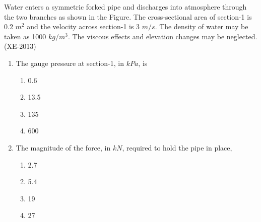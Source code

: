 \documentclass[journal]{IEEEtran}
\numberwithin{equation}{enumi}
\numberwithin{figure}{enumi}
\begin{document}
Water enters a symmetric forked pipe and discharges into atmosphere through the two branches as shown in the Figure. The cross-sectional area of section-1 is 0.2 $m^2$ and the velocity across section-1 is 3 $m/s$. The density of water may be taken as 1000 $kg/m^3$. The viscous effects and elevation changes may be neglected.\hfill(XE-2013)





\begin{enumerate}
    \item The gauge pressure at section-1, in $kPa$, is 
    \begin{multicols}{4}
        \begin{enumerate}
            \item 0.6
            \item 13.5
            \item 135
            \item 600
        \end{enumerate}
    \end{multicols}

    \item The magnitude of the force, in $kN$, required to hold the pipe in place,  
    \begin{multicols}{4}
        \begin{enumerate}
            \item 2.7
            \item 5.4
            \item 19
            \item 27
        \end{enumerate}
    \end{multicols}
\end{enumerate}
\end{document}
